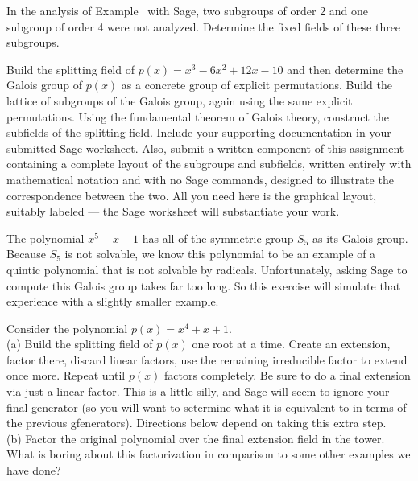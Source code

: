 \begin{sageverbatim}\end{sageverbatim}
%
%
In the analysis of Example~ with Sage, two subgroups of order 2 and one subgroup of order 4 were not analyzed.  Determine the fixed fields of these three subgroups.
\begin{sageverbatim}\end{sageverbatim}
%
%
Build the splitting field of $p(x)=x^3-6x^2+12x-10$ and then determine the Galois group of $p(x)$ as a concrete group of explicit permutations.  Build the lattice of subgroups of the Galois group, again using the same explicit permutations.  Using the fundamental theorem of Galois theory, construct the subfields of the splitting field.  Include your supporting documentation in your submitted Sage worksheet.  Also, submit a written component of this assignment containing a complete layout of the subgroups and subfields, written entirely with mathematical notation and with no Sage commands, designed to illustrate the correspondence between the two.  All you need here is the graphical layout, suitably labeled --- the Sage worksheet will substantiate your work.
\begin{sageverbatim}\end{sageverbatim}
%
%
The polynomial $x^5-x-1$ has all of the symmetric group $S_5$ as its Galois group.  Because $S_5$ is not solvable, we know this polynomial to be an example of a quintic polynomial that is not solvable by radicals.  Unfortunately, asking Sage to compute this Galois group takes far too long.  So this exercise will simulate that experience with a slightly smaller example.\par
%
Consider the polynomial $p(x)=x^4+x+1$.\\
%
(a) Build the splitting field of $p(x)$ one root at a time.  Create an extension, factor there, discard linear factors, use the remaining irreducible factor to extend once more.  Repeat until $p(x)$ factors completely.  Be sure to do a final extension via just a linear factor.  This is a little silly, and Sage will seem to ignore your final generator (so you will want to setermine what it is equivalent to in terms of the previous gfenerators).  Directions below depend on taking this extra step.\\
%
(b) Factor the original polynomial over the final extension field in the tower.  What is boring about this factorization in comparison to some other examples we have done?\\
